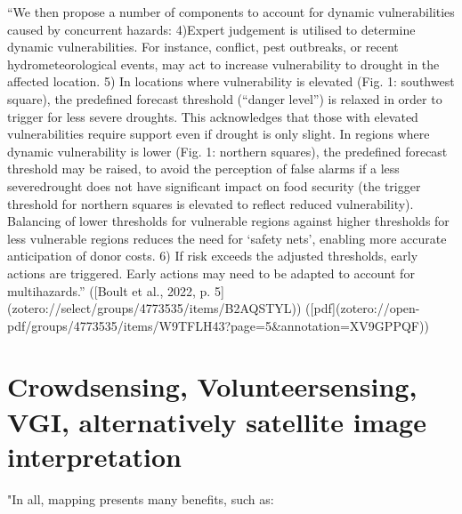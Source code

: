 {“We then propose a number of components to account for dynamic vulnerabilities caused by concurrent hazards:
4)Expert judgement is utilised to determine dynamic vulnerabilities. For instance, conflict, pest outbreaks, or recent hydrometeorological events, may act to increase vulnerability to drought in the affected location.
5) In locations where vulnerability is elevated (Fig. 1: southwest square), the predefined forecast threshold (“danger level”) is relaxed in order to trigger for less severe droughts. This acknowledges that those with elevated vulnerabilities require support even if drought is only slight. In regions where dynamic vulnerability is lower (Fig. 1: northern squares), the predefined forecast threshold may be raised, to avoid the perception of false alarms if a less severedrought does not have significant impact on food security (the trigger threshold for northern squares is elevated to reflect reduced vulnerability). Balancing of lower thresholds for vulnerable regions against higher thresholds for less vulnerable regions reduces the need for ‘safety nets’, enabling more accurate anticipation of donor costs.
6) If risk exceeds the adjusted thresholds, early actions are triggered. Early actions may need to be adapted to account for multihazards.” ([Boult et al., 2022, p. 5](zotero://select/groups/4773535/items/B2AQSTYL)) ([pdf](zotero://open-pdf/groups/4773535/items/W9TFLH43?page=5&annotation=XV9GPPQF))




\section{Crowdsensing, Volunteersensing, VGI,  alternatively satellite image interpretation}


"In all, mapping presents many benefits, such as:

}

